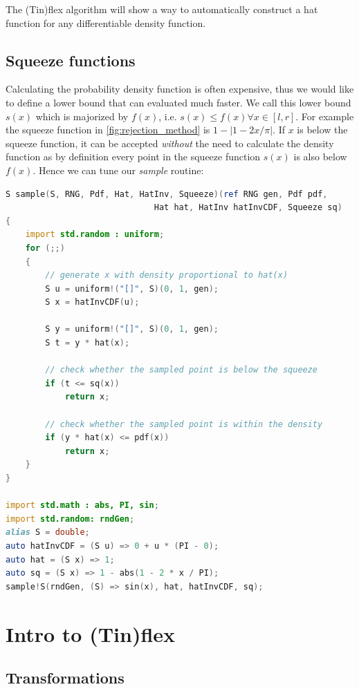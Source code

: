 \documentclass[]{article}
\begin{document}
The (Tin)flex algorithm will show a way to automatically construct a hat function for any differentiable density function.

\subsection{Squeeze functions}

Calculating the probability density function is often expensive, thus we would like to define a lower bound that can evaluated much faster. We call this lower bound $s(x)$ which is majorized by $f(x)$, i.e. $s(x) \leq f(x) \forall x \in [l, r]$. For example the squeeze function in \autoref{fig:rejection_method} is $1 - |1 - 2x / \pi |$. If $x$ is below the squeeze function, it can be accepted \textit{without} the need to calculate the density function as by definition every point in the squeeze function $s(x)$ is also below $f(x)$. Hence we can tune our \textit{sample} routine:

\begin{minipage}{0.9\linewidth}
\begin{lstlisting}[language=D]
S sample(S, RNG, Pdf, Hat, HatInv, Squeeze)(ref RNG gen, Pdf pdf,
                              Hat hat, HatInv hatInvCDF, Squeeze sq)
{
    import std.random : uniform;
    for (;;)
    {
        // generate x with density proportional to hat(x)
        S u = uniform!("[]", S)(0, 1, gen);
        S x = hatInvCDF(u);

        S y = uniform!("[]", S)(0, 1, gen);
        S t = y * hat(x);

        // check whether the sampled point is below the squeeze
        if (t <= sq(x))
            return x;

        // check whether the sampled point is within the density
        if (y * hat(x) <= pdf(x))
            return x;
    }
}

import std.math : abs, PI, sin;
import std.random: rndGen;
alias S = double;
auto hatInvCDF = (S u) => 0 + u * (PI - 0);
auto hat = (S x) => 1;
auto sq = (S x) => 1 - abs(1 - 2 * x / PI);
sample!S(rndGen, (S) => sin(x), hat, hatInvCDF, sq);
\end{lstlisting}
\end{minipage}

\section{Intro to (Tin)flex}

\subsection{Transformations}
\end{document}
